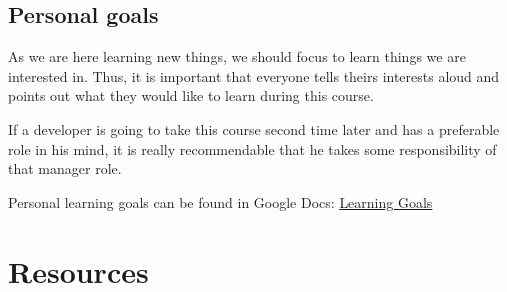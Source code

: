 \begin{table}[H]
\center
{}
\caption{Project goals in the priority order}
\label{table:Projectgoals}
\end{table}


\subsection{Personal goals}

As we are here learning new things, we should focus to learn things we are
interested in. Thus, it is important that everyone tells theirs interests
aloud and points out what they would like to learn during this course.

If a developer is going to take this course second time later and has a
preferable role in his mind, it is really recommendable that he takes some
responsibility of that manager role.

Personal learning goals can be found in Google Docs: 
\href{https://docs.google.com/spreadsheet/ccc?key=0Ahu59q_GwtcedHJZdjQ1RWROZFYxa
0RTcWp3MkJkTnc&usp=sharing}{Learning Goals}

\section{Resources}
